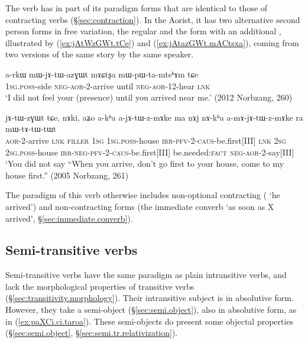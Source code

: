 The verb  has in part of its paradigm forms that are identical to those of contracting verbs (§\ref{sec:contraction}). In the Aorist, it has two alternative second person forms in free variation, the regular  and the form  with an additional , illustrated by (\ref{ex:jAtWzGWt.tCe}) and  (\ref{ex:jAtazGWt.mACtsxa}), coming from two versions of the same story by the same speaker. 

\begin{exe}
\ex \label{ex:jAtazGWt.mACtsxa}
\gll  a-rkɯ mɯ-jɤ-tɯ-azɣɯt mɤɕtʂa mɯ-pɯ-ta-mtsʰɤm tɕe \\
\textsc{1sg}.\textsc{poss}-side \textsc{neg}-\textsc{aor}-2-arrive until \textsc{neg}-\textsc{aor}-1\fl{}2-hear \textsc{lnk} \\
\glt `I did not feel your (presence) until you arrived near me.' (2012 Norbzang, 260)
\end{exe}

\begin{exe}
\ex \label{ex:jAtWzGWt.tCe}
\gll jɤ-tɯ-zɣɯt tɕe, nɤki, aʑo a-kʰa a-jɤ-tɯ-z-mɤke ma nɤj nɤ-kʰa a-mɤ-jɤ-tɯ-z-mɤke ra mɯ-tɤ-tɯ-tɯt \\
\textsc{aor}-2-arrive \textsc{lnk} \textsc{filler} \textsc{1sg} \textsc{1sg}.\textsc{poss}-house \textsc{irr}-\textsc{pfv}-2-\textsc{caus}-be.first[III] \textsc{lnk} 
\textsc{2sg} \textsc{2sg}.\textsc{poss}-house \textsc{irr}-\textsc{neg}-\textsc{pfv}-2-\textsc{caus}-be.first[III] be.needed:\textsc{fact} \textsc{neg}-\textsc{aor}-2-say[III] \\
\glt `You did not say ``When you arrive, don't go first to your house, come to my house first.'' (2005 Norbzang, 261)
\end{exe}

The paradigm of this verb otherwise includes non-optional contracting ( `he arrived') and non-contracting forms (the immediate converb  `as soon as X arrived', §\ref{sec:immediate.converb}).

\subsection{Semi-transitive verbs} \label{sec:semi.transitive}
Semi-transitive verbs have the same paradigm as plain intransitive verbs, and lack the morphological properties of transitive verbs (§\ref{sec:transitivity.morphology}). Their intransitive subject is in absolutive form. However, they take a semi-object (§\ref{sec:semi.object}), also in absolutive form, as  in (\ref{ex:paXCi.ci.taroa}). These semi-objects do present some objectal properties (§\ref{sec:semi.object}, §\ref{sec:semi.tr.relativization}).
 
